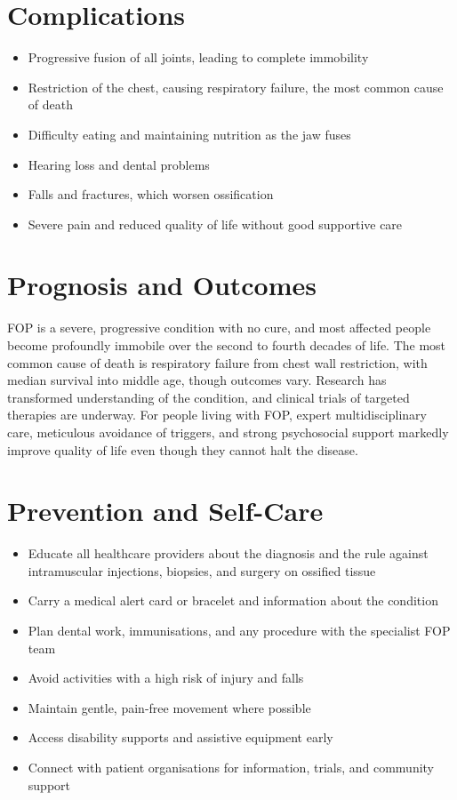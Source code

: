 \section*{Complications}
\begin{itemize}
    \item Progressive fusion of all joints, leading to complete immobility
    \item Restriction of the chest, causing respiratory failure, the most common cause of death
    \item Difficulty eating and maintaining nutrition as the jaw fuses
    \item Hearing loss and dental problems
    \item Falls and fractures, which worsen ossification
    \item Severe pain and reduced quality of life without good supportive care
\end{itemize}

\section*{Prognosis and Outcomes}
FOP is a severe, progressive condition with no cure, and most affected people become profoundly immobile over the second to fourth decades of life. The most common cause of death is respiratory failure from chest wall restriction, with median survival into middle age, though outcomes vary. Research has transformed understanding of the condition, and clinical trials of targeted therapies are underway. For people living with FOP, expert multidisciplinary care, meticulous avoidance of triggers, and strong psychosocial support markedly improve quality of life even though they cannot halt the disease.

\section*{Prevention and Self-Care}
\begin{itemize}
    \item Educate all healthcare providers about the diagnosis and the rule against intramuscular injections, biopsies, and surgery on ossified tissue
    \item Carry a medical alert card or bracelet and information about the condition
    \item Plan dental work, immunisations, and any procedure with the specialist FOP team
    \item Avoid activities with a high risk of injury and falls
    \item Maintain gentle, pain-free movement where possible
    \item Access disability supports and assistive equipment early
    \item Connect with patient organisations for information, trials, and community support
\end{itemize}

